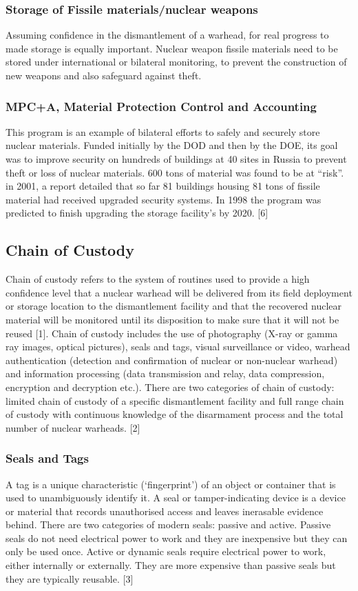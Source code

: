 \documentclass[a4paper]{article}
\begin{document}
\subsubsection{Storage of Fissile materials/nuclear weapons}
Assuming confidence in the dismantlement of a warhead, for real progress to made storage 
is equally important. Nuclear weapon fissile materials need to be stored under 
international or bilateral monitoring, to prevent the construction of new weapons and 
also safeguard against theft.

\subsubsection{MPC+A, Material Protection Control and Accounting}
This program is an example of bilateral efforts to safely and securely store nuclear 
materials. Funded initially by the DOD and then by the DOE, its goal was to improve 
security on hundreds of buildings at 40 sites in Russia to prevent theft or loss of 
nuclear materials. 600 tons of material was found to be at ``risk''. in 2001, a report 
detailed that so far 81 buildings housing 81 tons of fissile material had received 
upgraded security systems. In 1998 the program was predicted to finish upgrading the 
storage facility's by 2020. [6]

\subsection{Chain of Custody}
Chain of custody refers to the system of routines used to provide a high confidence level that a
nuclear warhead will be delivered from its field deployment or storage location to the
dismantlement facility and that the recovered nuclear material will be monitored until its disposition
to make sure that it will not be reused [1]. Chain of custody includes the use of photography (X-ray
or gamma ray images, optical pictures), seals and tags, visual surveillance or video, warhead
authentication (detection and confirmation of nuclear or non-nuclear warhead) and information
processing (data transmission and relay, data compression, encryption and decryption etc.). There
are two categories of chain of custody: limited chain of custody of a specific dismantlement facility
and full range chain of custody with continuous knowledge of the disarmament process and the total
number of nuclear warheads. [2]

\subsubsection{Seals and Tags}
A tag is a unique characteristic (`fingerprint') of an object or container that is used to unambiguously
identify it. A seal or tamper-indicating device is a device or material that records unauthorised access
and leaves inerasable evidence behind. There are two categories of modern seals: passive and
active. Passive seals do not need electrical power to work and they are inexpensive but they can only
be used once. Active or dynamic seals require electrical power to work, either internally or
externally. They are more expensive than passive seals but they are typically reusable. [3]
\end{document}
